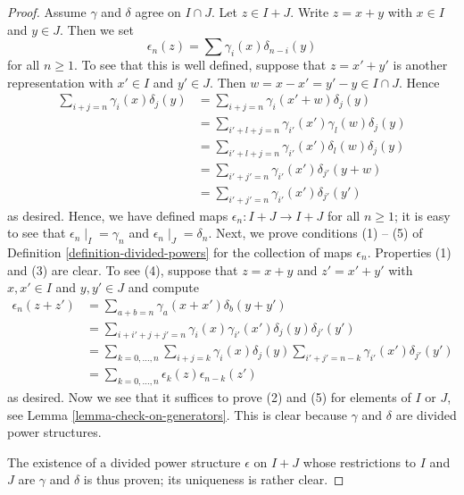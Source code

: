\begin{proof}
\medskip\noindent
Assume $\gamma$ and $\delta$ agree on $I \cap J$.
Let $z \in I + J$. Write $z = x + y$ with $x \in I$ and $y \in J$.
Then we set
$$
\epsilon_n(z) = \sum \gamma_i(x)\delta_{n - i}(y)
$$
for all $n \geq 1$.
To see that this is well defined, suppose that $z = x' + y'$ is another
representation with $x' \in I$ and $y' \in J$. Then
$w = x - x' = y' - y \in I \cap J$. Hence
\begin{align*}
\sum\nolimits_{i + j = n} \gamma_i(x)\delta_j(y)
& =
\sum\nolimits_{i + j = n} \gamma_i(x' + w)\delta_j(y) \\
& =
\sum\nolimits_{i' + l + j = n} \gamma_{i'}(x')\gamma_l(w)\delta_j(y) \\
& =
\sum\nolimits_{i' + l + j = n} \gamma_{i'}(x')\delta_l(w)\delta_j(y) \\
& =
\sum\nolimits_{i' + j' = n} \gamma_{i'}(x')\delta_{j'}(y + w) \\
& =
\sum\nolimits_{i' + j' = n} \gamma_{i'}(x')\delta_{j'}(y')
\end{align*}
as desired. Hence, we have defined maps
$\epsilon_n : I + J \to I + J$ for all $n \geq 1$; it is easy
to see that $\epsilon_n \mid_{I} = \gamma_n$ and
$\epsilon_n \mid_{J} = \delta_n$.
Next, we prove conditions (1) -- (5) of
Definition \ref{definition-divided-powers} for the collection
of maps $\epsilon_n$.
Properties (1) and (3) are clear. To see (4), suppose
that $z = x + y$ and $z' = x' + y'$ with $x, x' \in I$ and $y, y' \in J$
and compute
\begin{align*}
\epsilon_n(z + z') & =
\sum\nolimits_{a + b = n} \gamma_a(x + x')\delta_b(y + y') \\
& =
\sum\nolimits_{i + i' + j + j' = n}
\gamma_i(x) \gamma_{i'}(x')\delta_j(y)\delta_{j'}(y') \\
& =
\sum\nolimits_{k = 0, \ldots, n}
\sum\nolimits_{i+j=k} \gamma_i(x)\delta_j(y)
\sum\nolimits_{i'+j'=n-k} \gamma_{i'}(x')\delta_{j'}(y') \\
& =
\sum\nolimits_{k = 0, \ldots, n}\epsilon_k(z)\epsilon_{n-k}(z')
\end{align*}
as desired. Now we see that it suffices to prove (2) and (5) for
elements of $I$ or $J$, see Lemma \ref{lemma-check-on-generators}.
This is clear because $\gamma$ and $\delta$ are divided power
structures.

\medskip\noindent
The existence of a divided power structure $\epsilon$ on $I+J$
whose restrictions to $I$ and $J$ are $\gamma$ and $\delta$ is
thus proven; its uniqueness is rather clear.
\end{proof}

